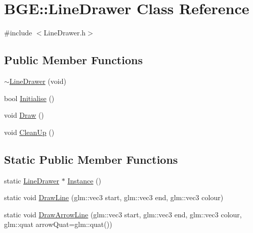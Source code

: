 \hypertarget{class_b_g_e_1_1_line_drawer}{\section{B\-G\-E\-:\-:Line\-Drawer Class Reference}
\label{class_b_g_e_1_1_line_drawer}
}


{\ttfamily \#include $<$Line\-Drawer.\-h$>$}

\subsection*{Public Member Functions}
\begin{DoxyCompactItemize}
\item 
\hyperlink{class_b_g_e_1_1_line_drawer_a059031817de66585c02026a116fc75f9}{$\sim$\-Line\-Drawer} (void)
\item 
bool \hyperlink{class_b_g_e_1_1_line_drawer_a1deaeb0b5b28a5a186eddbf9d6a17dc6}{Initialise} ()
\item 
void \hyperlink{class_b_g_e_1_1_line_drawer_a094e63eddc455d1526d57a4a9b9159db}{Draw} ()
\item 
void \hyperlink{class_b_g_e_1_1_line_drawer_ac4eb8f1a3f8240440340b9d2150e2bc4}{Clean\-Up} ()
\end{DoxyCompactItemize}
\subsection*{Static Public Member Functions}
\begin{DoxyCompactItemize}
\item 
static \hyperlink{class_b_g_e_1_1_line_drawer}{Line\-Drawer} $\ast$ \hyperlink{class_b_g_e_1_1_line_drawer_aae06b335f9d123ccd8162c914d4461dc}{Instance} ()
\item 
static void \hyperlink{class_b_g_e_1_1_line_drawer_a5977d87252af515791f7da3e8ca9fed2}{Draw\-Line} (glm\-::vec3 start, glm\-::vec3 end, glm\-::vec3 colour)
\item 
static void \hyperlink{class_b_g_e_1_1_line_drawer_a41ed949bc20803482a8d5c100f4994ef}{Draw\-Arrow\-Line} (glm\-::vec3 start, glm\-::vec3 end, glm\-::vec3 colour, glm\-::quat arrow\-Quat=glm\-::quat())
\end{DoxyCompactItemize}
